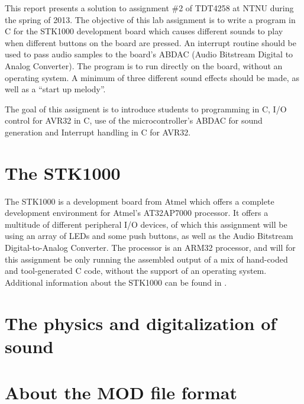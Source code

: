This report presents a solution to assignment \#2 of TDT4258 at NTNU during the spring of 2013.
The objective of this lab assignment is to write a program in C for the STK1000 development board which causes different sounds to play when different buttons on the board are pressed.
An interrupt routine should be used to pass audio samples to the board's ABDAC (Audio Bitstream Digital to Analog Converter).
The program is to run directly on the board, without an operating system.
A minimum of three different sound effects should be made, as well as a ``start up melody''.\cite{compendium}

The goal of this assigment is to introduce students to programming in C, I/O control for AVR32 in C, use of the microcontroller's ABDAC for sound generation and Interrupt handling in C for AVR32.

\section{The STK1000}
	The STK1000 is a development board from Atmel which offers a complete development environment for Atmel's AT32AP7000 processor.
	It offers a multitude of different peripheral I/O devices, of which this assignment will be using an array of LEDs and some push buttons, as well as the Audio Bitstream Digital-to-Analog Converter.
	The processor is an ARM32 processor, and will for this assignment be only running the assembled output of a mix of hand-coded and tool-generated C code, without the support of an operating system.
    Additional information about the STK1000 can be found in \cite{tdt4258-1}.

\section{The physics and digitalization of sound}
	


\section{About the MOD file format}
	
